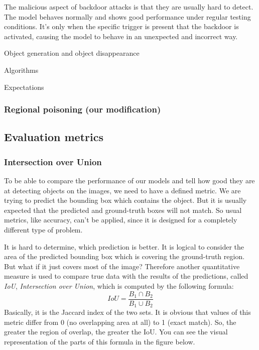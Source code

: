 \documentclass[14pt,a4paper]{extarticle}
\newcounter{e}
\newcounter{pic}
\numberwithin{equation}{section}
\numberwithin{figure}{section}
\begin{document}
The malicious aspect of backdoor attacks is that they are usually hard to detect. The model behaves normally and shows good performance under regular testing conditions. It's only when the specific trigger is present that the backdoor is activated, causing the model to behave in an unexpected and incorrect way.

Object generation and object disappearance


Algorithms


Expectations

\subsubsection{Regional poisoning (our modification)}




\subsection{Evaluation metrics}
\subsubsection{Intersection over Union}
To be able to compare the performance of our models and tell how good they are at detecting objects on the images, we need to have a defined metric.
We are trying to predict the bounding box which contains the object. But it is usually expected that the predicted and ground-truth boxes will not match. So usual metrics, like accuracy, can't be applied, since it is designed for a completely different type of problem.

It is hard to determine, which prediction is better. It is logical to consider the area of the predicted bounding box which is covering the ground-truth region. But what if it just covers most of the image? Therefore another quantitative measure is used to compare true data with the results of the predictions, called \textit{IoU}, \textit{Intersection over Union}, which is computed by the following formula:
\begin{equation}
    IoU = \frac{B_1 \cap B_2}{B_1 \cup B_2}
\end{equation}
Basically, it is the Jaccard index of the two sets.
It is obvious that values of this metric differ from 0 (no overlapping area at all) to 1 (exact match). So, the greater the region of overlap, the greater the IoU. You can see the visual representation of the parts of this formula in the figure below.
\end{document}
